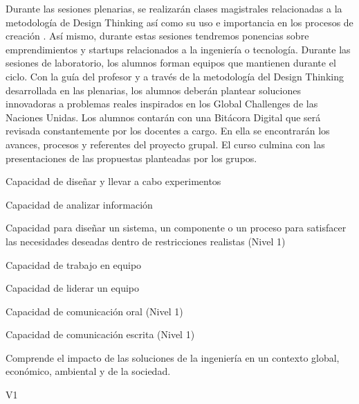 \begin{syllabus}


\begin{justification}
Durante las sesiones plenarias, se realizarán clases magistrales relacionadas a la metodología de Design Thinking así­ como su uso e importancia en los procesos de creación . Así­ mismo, durante estas sesiones tendremos ponencias sobre emprendimientos y startups relacionados a la ingeniería o tecnología.
Durante las sesiones de laboratorio, los alumnos forman equipos que mantienen durante el ciclo. Con la guía del profesor y a través de la metodología del Design Thinking desarrollada en las plenarias, los alumnos deberán plantear soluciones innovadoras a problemas reales inspirados en los Global Challenges de las Naciones Unidas.
Los alumnos contarán con una Bitácora Digital que será revisada constantemente por los docentes a cargo. En ella se encontrarán los avances, procesos y referentes del proyecto grupal. El curso culmina con las presentaciones de las propuestas planteadas por los grupos.
\end{justification}

\begin{goals}
\item Capacidad de diseñar y llevar a cabo experimentos 
\item Capacidad de analizar información
\item Capacidad para diseñar un sistema, un componente o un proceso para satisfacer las necesidades deseadas dentro de restricciones realistas (Nivel 1)
\item Capacidad de trabajo en equipo
\item Capacidad de liderar un equipo
\item Capacidad de comunicación oral (Nivel 1)
\item Capacidad de comunicación escrita (Nivel 1)
\item Comprende el impacto de las soluciones de la ingeniería en un contexto global, económico, ambiental y de la sociedad.

\end{goals}

\begin{outcomes}{V1}
    \item {}
    \item {}
\end{outcomes}


\end{syllabus}
